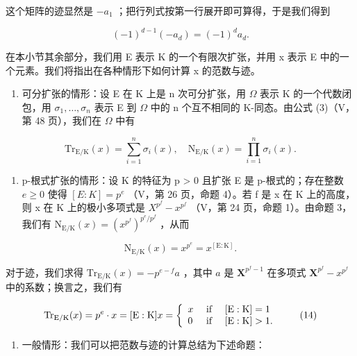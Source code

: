 这个矩阵的迹显然是 \(-a_{1}\) ；把行列式按第一行展开即可算得，于是我们得到

\[
(- 1) ^ {d - 1} (- a _ {d}) = (- 1) ^ {d} a _ {d}.
\]

在本小节其余部分，我们用 E 表示 K 的一个有限次扩张，并用 x 表示 E 中的一个元素。我们将指出在各种情形下如何计算 x 的范数与迹。

\begin{enumerate}
\def\labelenumi{\alph{enumi})}
\tightlist
\item
  可分扩张的情形：设 E 在 K 上是 n 次可分扩张，用 \(\Omega\) 表示 K 的一个代数闭包，用 \(\sigma_{1}, \ldots, \sigma_{n}\) 表示 E 到 \(\Omega\) 中的 n 个互不相同的 K-同态。由公式 (3)（V，第 48 页），我们在 \(\Omega\) 中有
\end{enumerate}

\[
\mathrm{Tr} _ {\mathrm{E} / \mathrm{K}} (x) = \sum_ {i = 1} ^ {n} \sigma_ {i} (x), \quad \mathrm{N} _ {\mathrm{E} / \mathrm{K}} (x) = \prod_ {i = 1} ^ {n} \sigma_ {i} (x).\tag{12}
\]

\begin{enumerate}
\def\labelenumi{\alph{enumi})}
\setcounter{enumi}{1}
\tightlist
\item
  p-根式扩张的情形：设 K 的特征为 p \textgreater{} 0 且扩张 E 是 p-根式的；存在整数 \(e \geqslant 0\) 使得 \([E : K] = p^{e}\) （V，第 26 页，命题 4）。若 f 是 x 在 K 上的高度，则 x 在 K 上的极小多项式是 \(X^{p^{f}} - x^{p^{f}}\) （V，第 24 页，命题 1）。由命题 3，我们有 \(\mathrm{N}_{\mathrm{E}/\mathrm{K}}(x) = (x^{p^{f}})^{p^{e}/p^{f}}\) ，从而
\end{enumerate}

\[
\mathrm{N} _ {\mathrm{E} / \mathrm{K}} (x) = x ^ {p ^ {e}} = x ^ {[ \mathrm{E}: \mathrm{K} ]}.\tag{13}
\]

对于迹，我们求得 \(\mathrm{Tr}_{\mathrm{E} / \mathrm{K}}(x) = -p^{e - f}a\) ，其中 \(a\) 是 \(\mathbf{X}^{p^f - 1}\) 在多项式 \(\mathbf{X}^{p^f} - x^{p^f}\) 中的系数；换言之，我们有

\[
\operatorname{Tr} _ {\mathrm{E} / \mathrm{K}} (x) = p ^ {e} \cdot x = [ \mathrm{E}: \mathrm{K} ] x = \left\{ \begin{array}{l l} x & \text { if } \quad [ \mathrm{E}: \mathrm{K} ] = 1 \\ 0 & \text { if } \quad [ \mathrm{E}: \mathrm{K} ] > 1. \end{array} \right.\tag{14}
\]

\begin{enumerate}
\def\labelenumi{\alph{enumi})}
\setcounter{enumi}{2}
\tightlist
\item
  一般情形：我们可以把范数与迹的计算总结为下述命题：
\end{enumerate}

